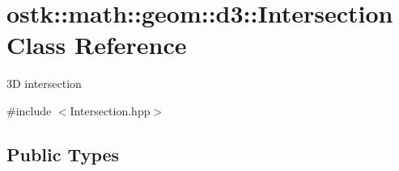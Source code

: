 \hypertarget{classostk_1_1math_1_1geom_1_1d3_1_1_intersection}{}\section{ostk\+:\+:math\+:\+:geom\+:\+:d3\+:\+:Intersection Class Reference}
\label{classostk_1_1math_1_1geom_1_1d3_1_1_intersection}


3D intersection  




{\ttfamily \#include $<$Intersection.\+hpp$>$}

\subsection*{Public Types}
